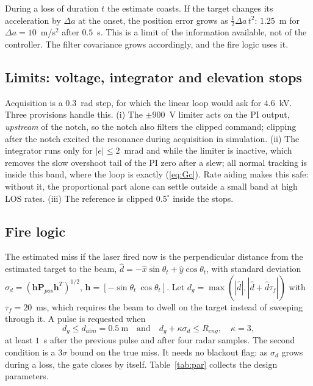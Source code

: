 \documentclass[conference]{IEEEtran}
\newcommand{\Reng}{R_{eng}}
\begin{document}
During a loss of duration $t$ the estimate coasts. If the target changes its acceleration by $\Delta a$ at the onset, the position error grows as $\tfrac12\Delta a\,t^2$: $1.25$~m for $\Delta a=10$~m/s$^2$ after $0.5$~s. This is a limit of the information available, not of the controller. The filter covariance grows accordingly, and the fire logic uses it.

\subsection{Limits: voltage, integrator and elevation stops}
Acquisition is a $0.3$~rad step, for which the linear loop would ask for $4.6$~kV. Three provisions handle this. (i) The $\pm900$~V limiter acts on the PI output, \emph{upstream} of the notch, so the notch also filters the clipped command; clipping after the notch excited the resonance during acquisition in simulation. (ii) The integrator runs only for $|e|\le2$~mrad and while the limiter is inactive, which removes the slow overshoot tail of the PI zero after a slew; all normal tracking is inside this band, where the loop is exactly (\ref{eq:Gc}). Rate aiding makes this safe: without it, the proportional part alone can settle outside a small band at high LOS rates. (iii) The reference is clipped $0.5^\circ$ inside the stops.

\subsection{Fire logic}
The estimated miss if the laser fired now is the perpendicular distance from the estimated target to the beam, $\hat d=-\hat x\sin\theta_t+\hat y\cos\theta_t$, with standard deviation $\sigma_d=(\mathbf h\mathbf P_{pos}\mathbf h^T)^{1/2}$, $\mathbf h=[-\sin\theta_t\ \cos\theta_t]$. Let $d_g=\max(|\hat d|,|\hat d+\dot{\hat d}\tau_f|)$ with $\tau_f=20$~ms, which requires the beam to dwell on the target instead of sweeping through it. A pulse is requested when
\begin{equation}
d_g\le d_{aim}=0.5~\mathrm{m}\quad\text{and}\quad d_g+\kappa\sigma_d\le\Reng,\quad\kappa=3,
\end{equation}
at least $1$~s after the previous pulse and after four radar samples. The second condition is a $3\sigma$ bound on the true miss. It needs no blackout flag: as $\sigma_d$ grows during a loss, the gate closes by itself. Table~\ref{tab:par} collects the design parameters.
\end{document}
